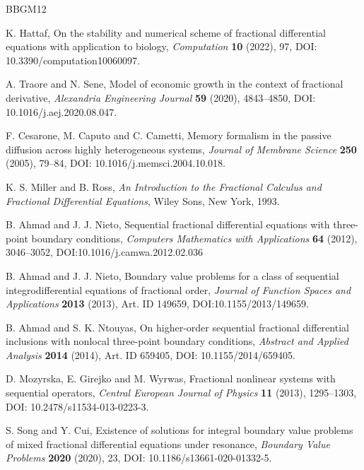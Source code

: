 \documentclass{amsart}
\numberwithin{equation}{section}
\begin{document}
\begin{thebibliography}{BBGM12}

K. Hattaf, On the stability and numerical scheme of fractional differential equations with application to biology, \emph{Computation} \textbf{10} (2022), 97, DOI: 10.3390/computation10060097.

A. Traore and N. Sene, Model of economic growth in the context of fractional derivative, \emph{Alexandria Engineering Journal} \textbf{59} (2020), 4843--4850, DOI: 10.1016/j.aej.2020.08.047.

F. Cesarone, M. Caputo and C. Cametti, Memory formalism in the passive diffusion across highly heterogeneous systems, \emph{Journal of Membrane Science} \textbf{250} (2005), 79--84, DOI: 10.1016/j.memsci.2004.10.018.

K. S. Miller and B. Ross, \emph{An Introduction to the Fractional Calculus and Fractional Differential Equations}, Wiley Sons, New York, 1993.

B. Ahmad and J. J. Nieto, Sequential fractional differential equations with three-point boundary conditions, \emph{Computers Mathematics with Applications} \textbf{64} (2012), 3046--3052, DOI:10.1016/j.camwa.2012.02.036

B. Ahmad and J. J. Nieto, Boundary value problems for a class of sequential integrodifferential equations of fractional order, \emph{Journal of Function Spaces and Applications} \textbf{2013} (2013), Art. ID 149659, DOI:10.1155/2013/149659.

B. Ahmad and S. K. Ntouyas, On higher-order sequential fractional differential inclusions with nonlocal three-point boundary conditions, \emph{Abstract and Applied Analysis} \textbf{2014} (2014), Art. ID 659405, DOI: 10.1155/2014/659405.

D. Mozyrska, E. Girejko and M. Wyrwas, Fractional nonlinear systems with sequential operators, \emph{Central European Journal of Physics} \textbf{11} (2013), 1295--1303, DOI: 10.2478/s11534-013-0223-3.

S. Song and Y. Cui, Existence of solutions for integral boundary value problems of mixed fractional differential equations under resonance, \emph{Boundary Value Problems} \textbf{2020} (2020), 23, DOI: 10.1186/s13661-020-01332-5.


\end{thebibliography}
\end{document}
